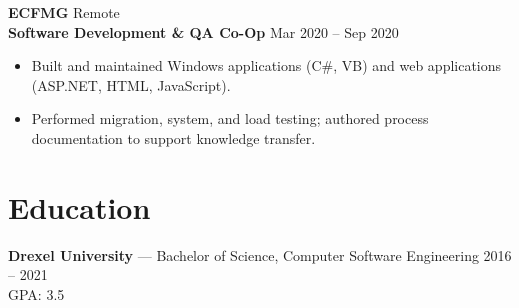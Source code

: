 \documentclass[11pt,letterpaper]{article}
\begin{document}
                                                                                                        \vspace{6pt}
                                                                                                        
                                                                                                        \textbf{\large ECFMG} \hfill Remote \\
                                                                                                        \textbf{Software Development \& QA Co-Op} \hfill Mar 2020 -- Sep 2020
                                                                                                        \begin{itemize}
                                                                                                            \item Built and maintained Windows applications (C\#, VB) and web applications (ASP.NET, HTML, JavaScript).
                                                                                                                \item Performed migration, system, and load testing; authored process documentation to support knowledge transfer.
                                                                                                                \end{itemize}
                                                                                                                
                                                                                                                \section{Education}
                                                                                                                \textbf{Drexel University} --- Bachelor of Science, Computer Software Engineering \hfill 2016 -- 2021 \\
                                                                                                                GPA: 3.5
                                                                                                                
\end{document}
